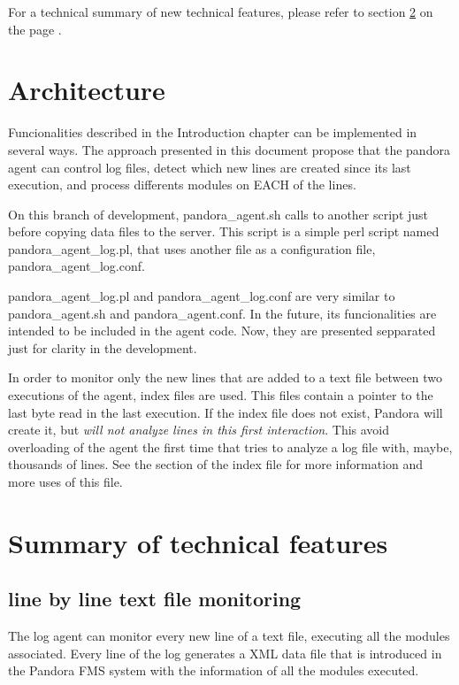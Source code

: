 \documentclass[a4paper,10pt]{article}
\begin{document}
      For a technical summary of new technical features, please refer to section \ref{sec:techsummary} on the page \pageref{sec:techsummary}.

\section{Architecture}

      Funcionalities described in the Introduction chapter can be implemented
      in several ways. The approach presented in this document propose that
      the pandora agent can control log files, detect which new lines are
      created since its last execution, and process differents modules on
      EACH of the lines.

      On this branch of development, pandora\_agent.sh calls to another script
      just before copying data files to the server. This script is a simple
      perl script named pandora\_agent\_log.pl, that uses another file as 
      a configuration file, pandora\_agent\_log.conf.

      pandora\_agent\_log.pl and pandora\_agent\_log.conf are very similar to
      pandora\_agent.sh and pandora\_agent.conf. In the future, its 
      funcionalities are intended to be included in the agent code. Now,
      they are presented sepparated just for clarity in the development.

In order to monitor only the new lines that are added to a text file between two executions of the agent, index files are used. This files contain a pointer to the last byte read in the last execution. If the index file does not exist, Pandora will create it, but \emph{will not analyze lines in this first interaction}. This avoid overloading of the agent the first time that tries to analyze a log file with, maybe, thousands of lines. See the section of the index file for more information and more uses of this file.


\section{Summary of technical features}\label{sec:techsummary}

\subsection{line by line text file monitoring}

The log agent can monitor every new line of a text file, executing all the modules associated. Every line of the log generates a XML data file that is introduced in the Pandora FMS system with the information of all the modules executed.
\end{document}
